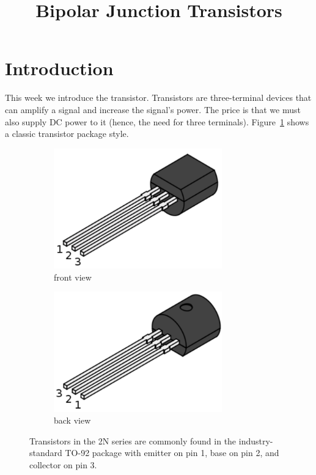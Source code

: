 \documentclass{article}
\title{Bipolar Junction Transistors}
\begin{document}
\maketitle

\section{Introduction}
This week we introduce the transistor.  Transistors are three-terminal devices that can amplify a signal and increase the signal's power. The price is that we must also supply DC power to it (hence, the need for three terminals).  Figure~\ref{fig:transistor-TO-92} shows a classic transistor package style.

\begin{figure}
\begin{center}
\begin{subfigure}{0.4\textwidth}
\begin{center}
\includegraphics[width=0.8\textwidth]{pics/TO-92_Front_with_Pin_Numbers}
\end{center}
\caption{front view}
\end{subfigure}
\begin{subfigure}{0.4\textwidth}
\begin{center}
\includegraphics[width=0.8\textwidth]{pics/TO-92_Back_with_Pin_Numbers}
\end{center}
\caption{back view}
\end{subfigure}
\end{center}
\caption{Transistors in the 2N series are commonly found in the industry-standard TO-92 package with emitter on pin 1, base on pin 2, and collector on pin 3.}
\label{fig:transistor-TO-92}
\end{figure}
\end{document}
